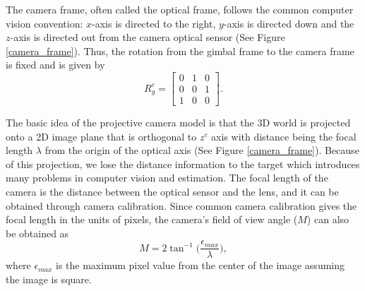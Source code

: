 The camera frame, often called the optical frame, follows the common computer vision convention: $x$-axis is directed to the right, $y$-axis is directed down and the $z$-axis is directed out from the camera optical sensor (See Figure \ref{camera_frame}). Thus, the rotation from the gimbal frame to the camera frame is fixed and is given by 
\begin{equation}
R^{c}_g =
\begin{bmatrix}
0 & 1 & 0 \\
0 & 0 & 1 \\
1 & 0 & 0
\end{bmatrix}.
\label{eq4}
\end{equation}

The basic idea of the projective camera model is that the 3D world is projected onto a 2D image plane that is orthogonal to $z^c$ axis with distance being the focal length $\lambda$ from the origin of the optical axis (See Figure \ref{camera_frame}). Because of this projection, we lose the distance information to the target which introduces many problems in computer vision and estimation. 
The focal length of the camera is the distance between the optical sensor and the lens, and it can be obtained through camera calibration. Since common camera calibration gives the focal length in the units of pixels, the camera's field of view angle ($M$) can also be obtained as
\begin{equation}
M=2\tan^{-1}\bigg(\frac{\epsilon_{max}}{\lambda}\bigg),
\end{equation}
where $\epsilon_{max}$ is the maximum pixel value from the center of the image assuming the image is square. 


